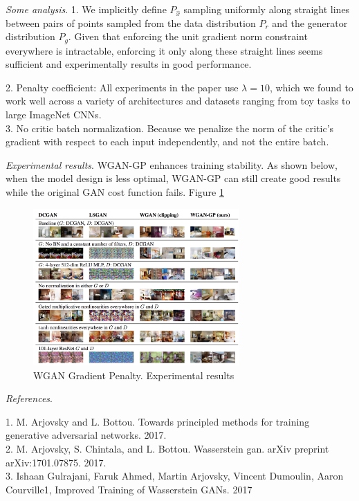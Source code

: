 \documentclass[english]{article}
\begin{document}
\item {\emph{Some analysis}}.
1. We implicitly define $P_{\hat{x}}$ sampling uniformly along straight lines between
pairs of points sampled from the data distribution $P_r$ and the generator distribution $P_g$. Given that enforcing the unit gradient norm constraint everywhere is intractable, enforcing it only along these straight lines seems sufficient and experimentally results in good performance.

2. Penalty coefficient: All experiments in the paper use $\lambda=10$, which we found to work well across a variety of architectures and datasets ranging from toy tasks to large ImageNet CNNs.\\
3. No critic batch normalization. Because we penalize the norm of the critic's gradient with respect to each input independently, and not the entire batch. 





\item {\emph{Experimental results}}.
WGAN-GP enhances training stability. As shown below, when the model design is less optimal, WGAN-GP can still create good results while the original GAN cost function fails. Figure \ref{wgan_gp_exp}

\begin{figure}[h!]
  \centering
  \includegraphics[width=0.7\textwidth]{experiment.png}
    \caption{WGAN Gradient Penalty. Experimental results}
  \label{wgan_gp_exp}
 \end{figure}

\item {\emph{References}}.

1. M. Arjovsky and L. Bottou. Towards principled methods for training generative adversarial networks. 2017.\\
2. M. Arjovsky, S. Chintala, and L. Bottou. Wasserstein gan. arXiv preprint arXiv:1701.07875. 2017.\\
3. Ishaan Gulrajani, Faruk Ahmed, Martin Arjovsky, Vincent Dumoulin, Aaron Courville1, Improved Training of Wasserstein GANs. 2017\\
\end{document}
